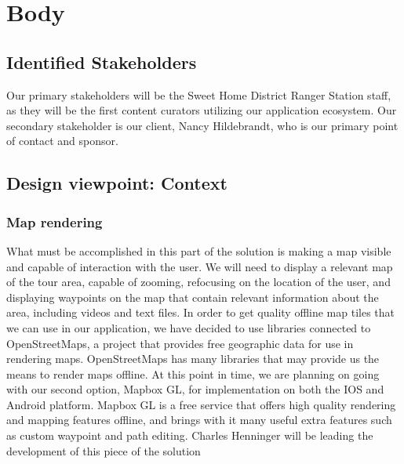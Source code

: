 \documentclass[letterpaper, 10pt,titlepage]{article}
\begin{document}
\section{Body}
\subsection{Identified Stakeholders}
Our primary stakeholders will be the Sweet Home District Ranger Station staff, as they will be the first content curators utilizing our application ecosystem. Our secondary stakeholder is our client, Nancy Hildebrandt, who is our primary point of contact and sponsor.


\subsection{Design viewpoint: Context}

\subsubsection{Map rendering}
What must be accomplished in this part of the solution is making a map visible and capable of interaction with the user. We will need to display a relevant map of the tour area, capable of zooming, refocusing on the location of the user, and displaying waypoints on the map that contain relevant information about the area, including videos and text files. In order to get quality offline map tiles that we can use in our application, we have decided to use libraries connected to OpenStreetMaps, a project that provides free geographic data for use in rendering maps. OpenStreetMaps has many libraries that may provide us the means to render maps offline. At this point in time, we are planning on going with our second option, Mapbox GL, for implementation on both the IOS and Android platform. Mapbox GL is a free service that offers high quality rendering and mapping features offline, and brings with it many useful extra features such as custom waypoint and path editing. Charles Henninger will be leading the development of this piece of the solution
\end{document}
